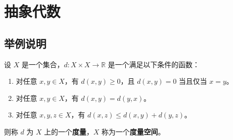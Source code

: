 \documentclass[12pt, a4paper, oneside, UTF8]{ctexbook}
\begin{document}
	\else
	\fi
	\chapter{抽象代数}
	
	\section{举例说明}
	
	\begin{defn}
		设 $X$ 是一个集合，$d: X \times X \to \mathbb{R}$ 是一个满足以下条件的函数：
		\begin{enumerate}
			\item 对任意 $x, y \in X$，有 $d(x, y) \geq 0$，且 $d(x, y) = 0$ 当且仅当 $x = y$。
			\item 对任意 $x, y \in X$，有 $d(x, y) = d(y, x)$。
			\item 对任意 $x, y, z \in X$，有 $d(x, z) \leq d(x, y) + d(y, z)$。
		\end{enumerate}
		则称 $d$ 为 $X$ 上的一个\textbf{度量}，$X$ 称为一个\textbf{度量空间}。
	\end{defn}
	
	\ifx\allfiles\undefined
\end{document}
